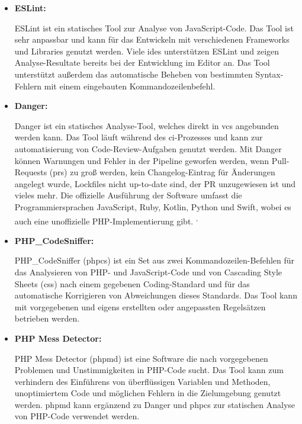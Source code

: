 \begin{itemize}
    \item {
        \textbf{ESLint:}\par
        ESLint ist ein statisches Tool zur Analyse von JavaScript-Code.
        Das Tool ist sehr anpassbar und kann für das Entwickeln mit verschiedenen Frameworks und Libraries genutzt
        werden.
        Viele \acrshort{ide}s unterstützen ESLint und zeigen Analyse-Resultate bereits bei der Entwicklung im Editor
        an.
        Das Tool unterstützt außerdem das automatische Beheben von bestimmten Syntax-Fehlern mit einem eingebauten
        Kommandozeilenbefehl.
    }

    \item {
        \textbf{Danger:}\par
        Danger ist ein statisches Analyse-Tool, welches direkt in \acrshort{vcs} angebunden werden kann.
        Das Tool läuft während des \acrshort{ci}-Prozesses und kann zur automatisierung von Code-Review-Aufgaben
        genutzt werden.
        Mit Danger können Warnungen und Fehler in der Pipeline geworfen werden, wenn Pull-Requests (\acrshort{pr}s) zu
        groß werden, kein Changelog-Eintrag für Änderungen angelegt wurde, Lockfiles nicht up-to-date sind, der PR
        unzugewiesen ist und vieles mehr.
        Die offizielle Ausführung der Software umfasst die Programmiersprachen JavaScript, Ruby, Kotlin, Python und
        Swift, wobei es auch eine unoffizielle PHP-Implementierung gibt.
        \textsuperscript{,\ }
    }

    \item {
        \textbf{PHP\_CodeSniffer:}\par
        PHP\_CodeSniffer (\acrshort{phpcs}) ist ein Set aus zwei Kommandozeilen-Befehlen für das Analysieren von PHP-
        und JavaScript-Code und von Cascading Style Sheets (\acrshort{css}) nach einem gegebenen Coding-Standard und für
        das automatische Korrigieren von Abweichungen dieses Standards.
        Das Tool kann mit vorgegebenen und eigens erstellten oder angepassten Regelsätzen betrieben werden.
    }

    \item {
        \textbf{PHP Mess Detector:}\par
        PHP Mess Detector (\acrshort{phpmd}) ist eine Software die nach vorgegebenen Problemen und Unstimmigkeiten in
        PHP-Code sucht.
        Das Tool kann zum verhindern des Einführens von überflüssigen Variablen und Methoden, unoptimiertem Code und
        möglichen Fehlern in die Zielumgebung genutzt werden.
        \acrshort{phpmd} kann ergänzend zu Danger und \acrshort{phpcs} zur statischen Analyse von PHP-Code verwendet
        werden.
    }


\end{itemize}
